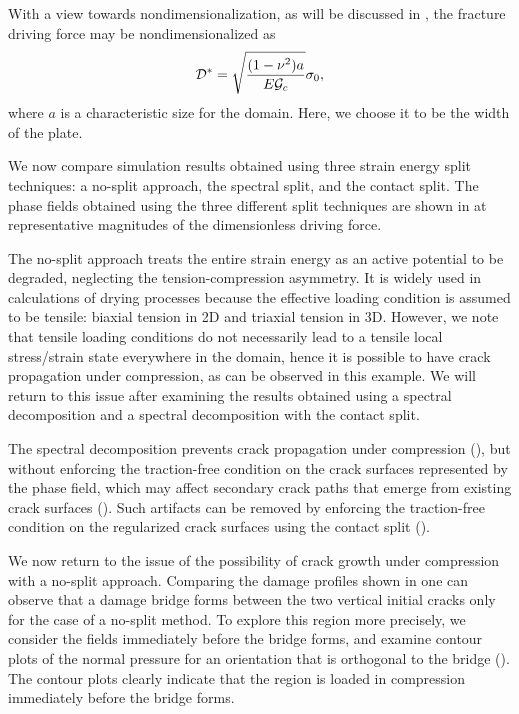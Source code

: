 With a view towards nondimensionalization, as will be discussed in , the fracture driving force may be nondimensionalized as
\begin{align}
  \mathcal{D}^* = \sqrt{\dfrac{(1-\nu^2)a}{E{\mathcal{G}_c}}}\sigma_0,
\end{align}
where $a$ is a characteristic size for the domain.  Here, we choose it to be the width of the plate.



We now compare simulation results obtained using three strain energy split techniques: a no-split approach, the spectral split, and the contact split. The phase fields obtained using the three different split techniques are shown in  at representative magnitudes of the dimensionless driving force.



The no-split approach treats the entire strain energy as an active potential to be degraded, neglecting the tension-compression asymmetry. It is widely used in calculations of drying processes because the effective loading condition is assumed to be tensile: biaxial tension in 2D and triaxial tension in 3D. However, we note that tensile loading conditions do not necessarily lead to a tensile local stress/strain state everywhere in the domain, hence it is possible to have crack propagation under compression, as can be observed  in this example.   We will return to this issue after examining the results obtained using a spectral decomposition and a spectral decomposition with the contact split.

The spectral decomposition prevents crack propagation under compression (), but without enforcing the traction-free condition on the crack surfaces represented by the phase field, which may affect secondary crack paths that emerge from existing crack surfaces ().
Such artifacts can be removed by enforcing the traction-free condition on the regularized crack surfaces using the contact split ().



We now return to the issue of the possibility of crack growth under compression with a no-split approach.  Comparing the damage profiles shown in 
one can observe that a damage bridge forms between the two vertical initial cracks only for the case of a no-split method.  To explore this region more precisely, we consider the fields immediately before the bridge forms, and examine contour plots of the normal pressure for an orientation that is orthogonal to the bridge (). The contour plots clearly indicate that the region is loaded in compression immediately before the bridge forms.

